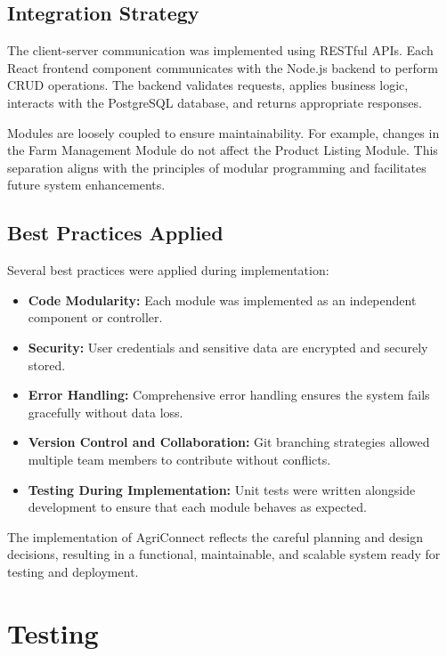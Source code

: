 \documentclass[12pt,a4paper]{article}
\begin{document}
\subsection{Integration Strategy}

The client-server communication was implemented using RESTful APIs. Each React frontend component communicates with the Node.js backend to perform CRUD operations. The backend validates requests, applies business logic, interacts with the PostgreSQL database, and returns appropriate responses.

Modules are loosely coupled to ensure maintainability. For example, changes in the Farm Management Module do not affect the Product Listing Module. This separation aligns with the principles of modular programming and facilitates future system enhancements.

\subsection{Best Practices Applied}

Several best practices were applied during implementation:

\begin{itemize}
    \item \textbf{Code Modularity:} Each module was implemented as an independent component or controller.
    \item \textbf{Security:} User credentials and sensitive data are encrypted and securely stored.
    \item \textbf{Error Handling:} Comprehensive error handling ensures the system fails gracefully without data loss.
    \item \textbf{Version Control and Collaboration:} Git branching strategies allowed multiple team members to contribute without conflicts.
    \item \textbf{Testing During Implementation:} Unit tests were written alongside development to ensure that each module behaves as expected.
\end{itemize}

The implementation of AgriConnect reflects the careful planning and design decisions, resulting in a functional, maintainable, and scalable system ready for testing and deployment.


\section{Testing}
\end{document}
